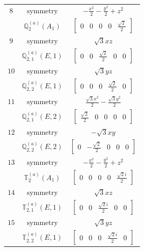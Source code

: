 \documentclass[fleqn,8pt,landscape]{jsarticle}
\begin{document}
\begin{longtable}{ccc}
$ 8 $ & $ \text{symmetry} $ & $ - \frac{x^{2}}{2} - \frac{y^{2}}{2} + z^{2} $ \\
$  $ & $ \mathbb{Q}_{2}^{(a)}(A_{1}) $ & $ \begin{bmatrix} 0 & 0 & 0 & 0 & \frac{\sqrt{2}}{2} \end{bmatrix} $ \\ \hline
$ 9 $ & $ \text{symmetry} $ & $ \sqrt{3} x z $ \\
$  $ & $ \mathbb{Q}_{2,1}^{(a)}(E,1) $ & $ \begin{bmatrix} 0 & 0 & \frac{\sqrt{2}}{2} & 0 & 0 \end{bmatrix} $ \\ \hline
$ 10 $ & $ \text{symmetry} $ & $ \sqrt{3} y z $ \\
$  $ & $ \mathbb{Q}_{2,2}^{(a)}(E,1) $ & $ \begin{bmatrix} 0 & 0 & 0 & \frac{\sqrt{2}}{2} & 0 \end{bmatrix} $ \\ \hline
$ 11 $ & $ \text{symmetry} $ & $ \frac{\sqrt{3} x^{2}}{2} - \frac{\sqrt{3} y^{2}}{2} $ \\
$  $ & $ \mathbb{Q}_{2,1}^{(a)}(E,2) $ & $ \begin{bmatrix} \frac{\sqrt{2}}{2} & 0 & 0 & 0 & 0 \end{bmatrix} $ \\ \hline
$ 12 $ & $ \text{symmetry} $ & $ - \sqrt{3} x y $ \\
$  $ & $ \mathbb{Q}_{2,2}^{(a)}(E,2) $ & $ \begin{bmatrix} 0 & - \frac{\sqrt{2}}{2} & 0 & 0 & 0 \end{bmatrix} $ \\ \hline
$ 13 $ & $ \text{symmetry} $ & $ - \frac{x^{2}}{2} - \frac{y^{2}}{2} + z^{2} $ \\
$  $ & $ \mathbb{T}_{2}^{(a)}(A_{1}) $ & $ \begin{bmatrix} 0 & 0 & 0 & 0 & \frac{\sqrt{2} i}{2} \end{bmatrix} $ \\ \hline
$ 14 $ & $ \text{symmetry} $ & $ \sqrt{3} x z $ \\
$  $ & $ \mathbb{T}_{2,1}^{(a)}(E,1) $ & $ \begin{bmatrix} 0 & 0 & \frac{\sqrt{2} i}{2} & 0 & 0 \end{bmatrix} $ \\ \hline
$ 15 $ & $ \text{symmetry} $ & $ \sqrt{3} y z $ \\
$  $ & $ \mathbb{T}_{2,2}^{(a)}(E,1) $ & $ \begin{bmatrix} 0 & 0 & 0 & \frac{\sqrt{2} i}{2} & 0 \end{bmatrix} $ \\ \hline

\end{longtable}
\end{document}
